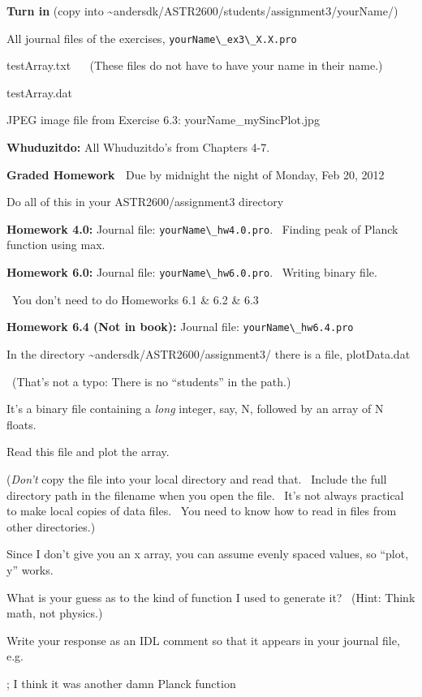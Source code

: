 \documentclass{article}
\begin{document}
\begin{spacing}{1.0}
\textbf{Turn in} (copy into
\textasciitilde{}andersdk/ASTR2600/students/assignment3/yourName/)

All journal files of the exercises, \verb|yourName\_ex3\_X.X.pro|

testArray.txt~ ~ (These files do not have to have your name in their
name.)

testArray.dat

JPEG image file from Exercise 6.3: yourName\_mySincPlot.jpg




\textbf{Whuduzitdo:} All Whuduzitdo's from Chapters 4-7.

\textbf{Graded Homework ~}Due by midnight the night of Monday, Feb 20,
2012

Do all of this in your ASTR2600/assignment3 directory


\textbf{Homework 4.0:} Journal file: \verb|yourName\_hw4.0.pro|.~ Finding peak
of Planck function using max.~

\textbf{Homework 6.0:} Journal file: \verb|yourName\_hw6.0.pro|.~ Writing
binary file.


~You don't need to do Homeworks 6.1 \& 6.2 \& 6.3


\textbf{Homework 6.4 (Not in book):} Journal file: \verb|yourName\_hw6.4.pro|

In the directory \textasciitilde{}andersdk/ASTR2600/assignment3/ there
is a file, plotData.dat

~(That's not a typo: There is no ``students'' in the path.)

It's a binary file containing a \emph{long} integer, say, N, followed by
an array of N floats.

Read this file and plot the array. ~

(\emph{Don't} copy the file into your local directory and read that.~
Include the full directory path in the filename when you open the file.~
It's not always practical to make local copies of data files.~ You need
to know how to read in files from other directories.)

Since I don't give you an x array, you can assume evenly spaced values,
so ``plot, y'' works.

What is your guess as to the kind of function I used to generate it?~
(Hint: Think math, not physics.)

Write your response as an IDL comment so that it appears in your journal
file, e.g. ~


; I think it was another damn Planck function



\end{spacing}
\end{document}
